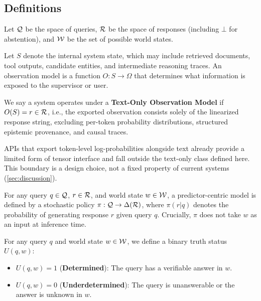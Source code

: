 \subsection{Definitions}

Let $\mathcal{Q}$ be the space of queries, $\mathcal{R}$ be the space of responses (including
$\bot$ for abstention), and $\mathcal{W}$ be the set of possible world states.

\begin{definition}
Let $S$ denote the internal system state, which may include retrieved documents,
tool outputs, candidate entities, and intermediate reasoning traces. An
observation model is a function $O : S \rightarrow \Omega$ that determines what
information is exposed to the supervisor or user.

We say a system operates under a \textbf{Text-Only Observation Model} if $O(S) =
r \in \mathcal{R}$, i.e., the exported observation consists solely of the linearized
response string, excluding per-token probability distributions, structured
epistemic provenance, and causal traces.
\end{definition}

\begin{remark}
APIs that export token-level log-probabilities alongside text already provide
a limited form of tensor interface and fall outside the text-only class defined
here. This boundary is a design choice, not a fixed property of current
systems (\autoref{sec:discussion}).
\end{remark}

\begin{definition}
For any query $q \in \mathcal{Q}$, $r \in \mathcal{R}$, and world state $w \in \mathcal{W}$, a
predictor-centric model is defined by a stochastic policy $\pi: \mathcal{Q} \to
\Delta(\mathcal{R})$, where $\pi(r|q)$ denotes the probability of generating response $r$
given query $q$. Crucially, $\pi$ does not take $w$ as an input at inference
time.
\end{definition}

\begin{definition}
For any query $q$ and world state $w \in \mathcal{W}$, we define a binary truth status
$U(q, w)$:
\begin{itemize}
\item $U(q, w) = 1$ (\textbf{Determined}): The query has a verifiable answer in $w$.
\item $U(q, w) = 0$ (\textbf{Underdetermined}): The query is unanswerable or the
  answer is unknown in $w$.
\end{itemize}
\end{definition}

